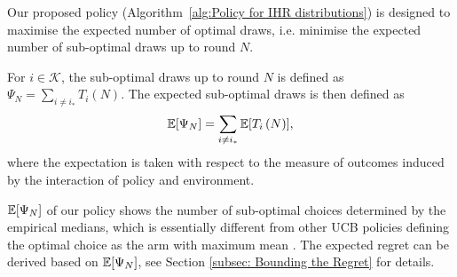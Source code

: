 Our proposed policy (Algorithm~\ref{alg:Policy for IHR distributions}) is designed
to maximise the expected number of optimal draws,
i.e. minimise the expected number of sub-optimal draws up to round $N$.
\begin{defi}
\label{defi: sub-optimal draws}
For $i \in \mathcal{K}$, the sub-optimal draws up to round $N$ is defined as $\Psi_N = \sum_{i \neq i_\ast} T_i\left(N\right)$. The expected sub-optimal draws is then defined as
\begin{align}
    \mathbb{E}[\Psi_N] = \sum_{i \neq i_\ast} \mathbb{E}[T_i\left(N\right)],
\end{align}
where the expectation is taken with respect to the measure of outcomes induced by the interaction of policy and environment.
\end{defi}
  $\mathbb{E}[\Psi_N]$ of our policy shows the number of sub-optimal choices determined by the empirical medians, which is essentially different from other UCB policies defining the optimal choice as the arm with maximum mean \cite{Auer2002, audibert2009exploration, garivier2011kl}.
  The expected regret can be derived based on $\mathbb{E}[\Psi_N]$, see Section \ref{subsec: Bounding the Regret} for details.




